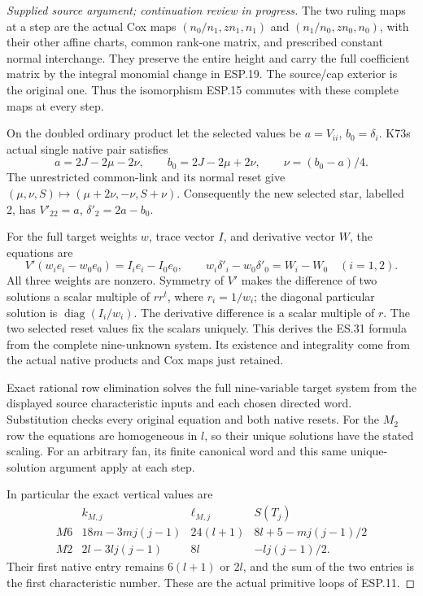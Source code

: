 \begin{proof}[Supplied source argument; continuation review in progress]
The two ruling maps at a step are the actual Cox maps
\((n_0/n_1,zn_1,n_1)\) and \((n_1/n_0,zn_0,n_0)\), with
their other affine charts, common rank-one matrix, and prescribed
constant normal interchange. They preserve the entire height and
carry the full coefficient matrix by the integral monomial change
in ESP.19. The source/cap exterior is the original one. Thus the
isomorphism ESP.15 commutes with these complete maps at every step.

On the doubled ordinary product let the selected values be
\(a=V_{ii}\), \(b_0=\delta_i\). K73\textquotesingle s actual single native pair
satisfies
\[
 a=2J-2\mu-2\nu,\qquad
 b_0=2J-2\mu+2\nu,
 \qquad \nu=(b_0-a)/4.
 \tag{ESP.29}
\]
The unrestricted common-link and its normal reset give
\((\mu,\nu,S)\mapsto(\mu+2\nu,-\nu,S+\nu)\).
Consequently the new selected star, labelled 2, has
\(V'_{22}=a\), \(\delta'_2=2a-b_0\).

For the full target weights \(w\), trace vector \(I\), and
derivative vector \(W\), the equations are
\[
 V'(w_ie_i-w_0e_0)=I_ie_i-I_0e_0,\qquad
 w_i\delta'_i-w_0\delta'_0=W_i-W_0\quad(i=1,2).
 \tag{ESP.30}
\]
All three weights are nonzero. Symmetry of \(V'\) makes the
difference of two solutions a scalar multiple of \(rr^t\),
where \(r_i=1/w_i\); the diagonal particular solution is
\(\operatorname{diag}(I_i/w_i)\). The derivative difference
is a scalar multiple of \(r\). The two selected reset values
fix the scalars uniquely. This derives the ES.31 formula from
the complete nine-unknown system. Its existence and integrality
come from the actual native products and Cox maps just retained.

Exact rational row elimination solves the full nine-variable
target system from the displayed source characteristic inputs and each
chosen directed word. Substitution checks every original equation and
both native resets. For the $M_2$ row the equations are homogeneous in
$l$, so their unique solutions have the stated scaling. For an arbitrary
fan, its finite canonical word and this same unique-solution argument
apply at each step.

In particular the exact vertical values are
\[
 \begin{array}{c|c|c|c}
 &k_{M,j}&\ell_{M,j}&S(T_j)\\\hline
 M6&18m-3mj(j-1)&24(l+1)&8l+5-mj(j-1)/2\\
 M2&2l-3lj(j-1)&8l&-lj(j-1)/2.
 \end{array}
 \tag{ESP.31}
\]
Their first native entry remains \(6(l+1)\) or \(2l\),
and the sum of the two entries is the first characteristic
number. These are the actual primitive loops of ESP.11.


\end{proof}
